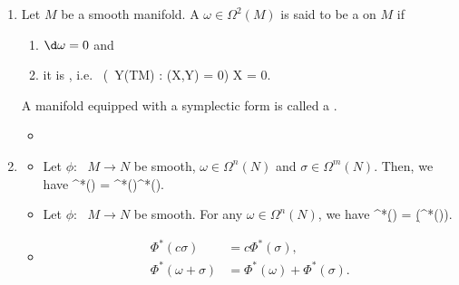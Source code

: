 \documentclass{article}
\newcommand{\cl}{:\text{ }}
\begin{document}
\begin{enumerate}
\begin{itemize}
\end{itemize}
\item {}
Let $M$ be a smooth manifold. A  $\omega\in\Omega^2(M)$ is said to be a  on $M$ if
\begin{enumerate}
    \item $\d \omega = 0$ and
    \item it is , i.e.\
\bse
(\forall \, Y\in \Gamma(TM) : \omega(X,Y) = 0) \Rightarrow X = 0.
\ese
\end{enumerate} 
A manifold equipped with a symplectic form is called a .
\begin{itemize}
    \item {} 
\end{itemize}


\item {}
\begin{itemize}
    \item {}

Let $\phi\cl M\to N$ be smooth, $\omega\in\Omega^n(N)$ and $\sigma\in\Omega^m(N)$. Then, we have
\bse
\Phi^*(\omega\wedge\sigma) = \Phi^*(\omega)\wedge\Phi^*(\sigma).  
\ese
\item  {}
Let $\phi\cl M\to N$ be smooth. For any $\omega\in\Omega^n(N)$, we have
\bse
\Phi^*(\d \omega) = \d (\Phi^*(\omega)).
\ese
\item {}
\begin{align*}
    \Phi^*(c\sigma) &= c\Phi^*(\sigma),\\
\Phi^*(\omega+\sigma) &= \Phi^*(\omega)+\Phi^*(\sigma).  
\end{align*}
\end{itemize}


\end{enumerate}
\end{document}
